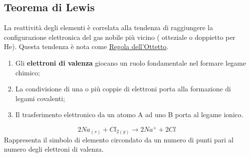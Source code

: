 \documentclass{book}
\begin{document}
\subsection{Teorema di Lewis}
La reattività degli elementi è correlata alla tendenza di raggiungere la
configurazione elettronica del gas nobile più vicino ({\color{red} otteziale} o
doppietto per He). Questa tendenza è nota come \underline{Regola dell'Ottetto}.
\begin{enumerate}
	\item Gli \textbf{elettroni di valenza} giocano un ruolo fondamentale nel
		formare legame chimico;
	\item La condivisione di una o più coppie di elettroni porta alla
		formazione di legami covalenti;
	\item Il trasferimento elettronico da un atomo {\color{red}A} ad uno
		{\color{blue}B} porta al legame ionico.
\end{enumerate}
\begin{equation}
	2Na_{(s)}+Cl_{2(g)}\to 2Na^++2Cl
\end{equation}
Rappresenta il simbolo di elemento circondato da un numero di punti pari al
numero degli elettroni di valenza.


\printindex
\end{document}
